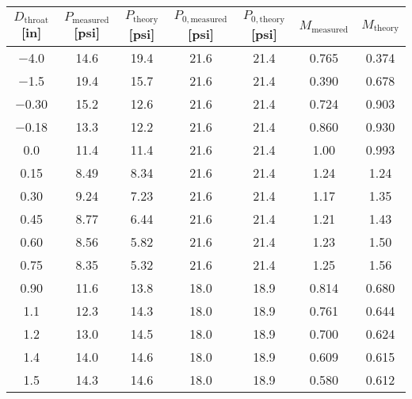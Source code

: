 \begin{tabular}{ccccccc}
\toprule
$D_\text{throat}$ [\unit{in}] & $P_\text{measured}$ [\unit{psi}] & $P_\text{theory}$ [\unit{psi}] & $P_{0,\text{measured}}$ [\unit{psi}] & $P_{0,\text{theory}}$ [\unit{psi}] & $M_\text{measured}$ & $M_\text{theory}$ \\
\midrule
\num{-4.0} & \num{14.6} & \num{19.4} & \num{21.6} & \num{21.4} & \num{0.765} & \num{0.374} \\ 
\num{-1.5} & \num{19.4} & \num{15.7} & \num{21.6} & \num{21.4} & \num{0.390} & \num{0.678} \\ 
\num{-0.30} & \num{15.2} & \num{12.6} & \num{21.6} & \num{21.4} & \num{0.724} & \num{0.903} \\ 
\num{-0.18} & \num{13.3} & \num{12.2} & \num{21.6} & \num{21.4} & \num{0.860} & \num{0.930} \\ 
\num{0.0} & \num{11.4} & \num{11.4} & \num{21.6} & \num{21.4} & \num{1.00} & \num{0.993} \\ 
\num{0.15} & \num{8.49} & \num{8.34} & \num{21.6} & \num{21.4} & \num{1.24} & \num{1.24} \\ 
\num{0.30} & \num{9.24} & \num{7.23} & \num{21.6} & \num{21.4} & \num{1.17} & \num{1.35} \\ 
\num{0.45} & \num{8.77} & \num{6.44} & \num{21.6} & \num{21.4} & \num{1.21} & \num{1.43} \\ 
\num{0.60} & \num{8.56} & \num{5.82} & \num{21.6} & \num{21.4} & \num{1.23} & \num{1.50} \\ 
\num{0.75} & \num{8.35} & \num{5.32} & \num{21.6} & \num{21.4} & \num{1.25} & \num{1.56} \\ 
\num{0.90} & \num{11.6} & \num{13.8} & \num{18.0} & \num{18.9} & \num{0.814} & \num{0.680} \\ 
\num{1.1} & \num{12.3} & \num{14.3} & \num{18.0} & \num{18.9} & \num{0.761} & \num{0.644} \\ 
\num{1.2} & \num{13.0} & \num{14.5} & \num{18.0} & \num{18.9} & \num{0.700} & \num{0.624} \\ 
\num{1.4} & \num{14.0} & \num{14.6} & \num{18.0} & \num{18.9} & \num{0.609} & \num{0.615} \\ 
\num{1.5} & \num{14.3} & \num{14.6} & \num{18.0} & \num{18.9} & \num{0.580} & \num{0.612} \\ 
\bottomrule
\end{tabular}